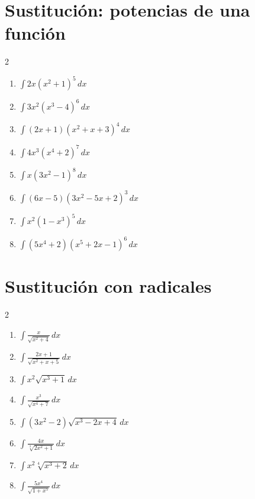 \documentclass[11pt]{article}
\begin{document}
\section{Sustitución: potencias de una función}
\begin{multicols}{2}\begin{enumerate}
\item $\displaystyle \int 2x(x^2+1)^5\,dx$
\item $\displaystyle \int 3x^2(x^3-4)^6\,dx$
\item $\displaystyle \int(2x+1)(x^2+x+3)^4\,dx$
\item $\displaystyle \int 4x^3(x^4+2)^7\,dx$
\item $\displaystyle \int x(3x^2-1)^8\,dx$
\item $\displaystyle \int(6x-5)(3x^2-5x+2)^3\,dx$
\item $\displaystyle \int x^2(1-x^3)^5\,dx$
\item $\displaystyle \int(5x^4+2)(x^5+2x-1)^6\,dx$
\end{enumerate}\end{multicols}

\section{Sustitución con radicales}
\begin{multicols}{2}\begin{enumerate}
\item $\displaystyle \int\frac{x}{\sqrt{x^2+4}}\,dx$
\item $\displaystyle \int\frac{2x+1}{\sqrt{x^2+x+5}}\,dx$
\item $\displaystyle \int x^2\sqrt{x^3+1}\,dx$
\item $\displaystyle \int\frac{x^3}{\sqrt{x^4+7}}\,dx$
\item $\displaystyle \int(3x^2-2)\sqrt{x^3-2x+4}\,dx$
\item $\displaystyle \int\frac{4x}{\sqrt[3]{2x^2+1}}\,dx$
\item $\displaystyle \int x^2\sqrt[4]{x^3+2}\,dx$
\item $\displaystyle \int\frac{5x^4}{\sqrt{1+x^5}}\,dx$
\end{enumerate}\end{multicols}
\end{document}
